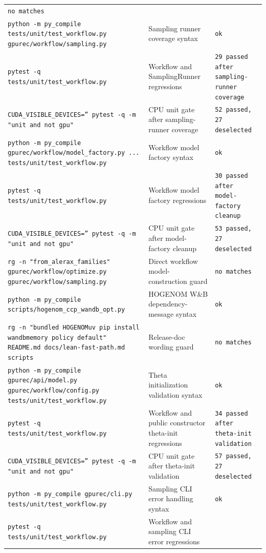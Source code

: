\documentclass[11pt]{article}
\begin{document}
\begin{center}
\begin{tabular}{lll}
\texttt{no matches} \\
\texttt{python -m py\_compile tests/unit/test\_workflow.py gpurec/workflow/sampling.py} &
Sampling runner coverage syntax &
\texttt{ok} \\
\texttt{pytest -q tests/unit/test\_workflow.py} &
Workflow and SamplingRunner regressions &
\texttt{29 passed after sampling-runner coverage} \\
\texttt{CUDA\_VISIBLE\_DEVICES='' pytest -q -m "unit and not gpu"} &
CPU unit gate after sampling-runner coverage &
\texttt{52 passed, 27 deselected} \\
\texttt{python -m py\_compile gpurec/workflow/model\_factory.py ... tests/unit/test\_workflow.py} &
Workflow model factory syntax &
\texttt{ok} \\
\texttt{pytest -q tests/unit/test\_workflow.py} &
Workflow model factory regressions &
\texttt{30 passed after model-factory cleanup} \\
\texttt{CUDA\_VISIBLE\_DEVICES='' pytest -q -m "unit and not gpu"} &
CPU unit gate after model-factory cleanup &
\texttt{53 passed, 27 deselected} \\
\texttt{rg -n "from\_alerax\_families" gpurec/workflow/optimize.py gpurec/workflow/sampling.py} &
Direct workflow model-construction guard &
\texttt{no matches} \\
\texttt{python -m py\_compile scripts/hogenom\_ccp\_wandb\_opt.py} &
HOGENOM W\&B dependency-message syntax &
\texttt{ok} \\
\texttt{rg -n "bundled HOGENOM\textbar{}uv pip install wandb\textbar{}memory policy default" README.md docs/lean-fast-path.md scripts} &
Release-doc wording guard &
\texttt{no matches} \\
\texttt{python -m py\_compile gpurec/api/model.py gpurec/workflow/config.py tests/unit/test\_workflow.py} &
Theta initialization validation syntax &
\texttt{ok} \\
\texttt{pytest -q tests/unit/test\_workflow.py} &
Workflow and public constructor theta-init regressions &
\texttt{34 passed after theta-init validation} \\
\texttt{CUDA\_VISIBLE\_DEVICES='' pytest -q -m "unit and not gpu"} &
CPU unit gate after theta-init validation &
\texttt{57 passed, 27 deselected} \\
\texttt{python -m py\_compile gpurec/cli.py tests/unit/test\_workflow.py} &
Sampling CLI error handling syntax &
\texttt{ok} \\
\texttt{pytest -q tests/unit/test\_workflow.py} &
Workflow and sampling CLI error regressions &

\end{tabular}
\end{center}
\end{document}
